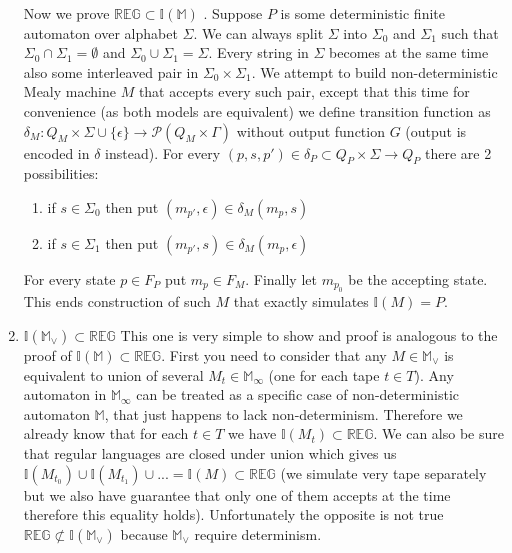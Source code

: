 \documentclass[12pt]{article}
\begin{document}
\begin{enumerate}
 Now we prove $\mathbb{REG} \subset \mathbb{I}(\mathbb{M})$ . Suppose $P$ is some deterministic finite automaton over alphabet $\Sigma$. We can always split $\Sigma$ into $\Sigma_0$ and $\Sigma_1$ such that $\Sigma_0 \cap \Sigma_1 = \emptyset$ and $\Sigma_0 \cup \Sigma_1 = \Sigma$. Every string in $\Sigma$ becomes at the same time also some interleaved pair in $\Sigma_0 \times \Sigma_1$. We attempt to build non-deterministic Mealy machine $M$ that accepts every such pair, except that this time for convenience (as both models are equivalent) we define transition function as $\delta_M : Q_M \times \Sigma \cup \{\epsilon\} \rightarrow \mathcal{P}(Q_M \times \Gamma)$ without output function $G$ (output is encoded in $\delta$ instead).  For every $(p,s,p') \in \delta_P \subset Q_P \times \Sigma \rightarrow Q_P$ there are 2 possibilities: 
\begin{enumerate}
	\item if $s \in \Sigma_0$ then put $(m_{p'},\epsilon) \in \delta_M(m_p,s) $ 
	\item if $s \in \Sigma_1$ then put $(m_{p'},s) \in \delta_M(m_p,\epsilon) $ 
\end{enumerate}
For every state $p \in F_P$ put $m_p \in F_M$. Finally let $m_{p_0}$ be the accepting state. This ends construction of such $M$  that exactly simulates $\mathbb{I}(M) = P$.

\item $\mathbb{I}(\mathbb{M}_\vee) \subset \mathbb{REG}$ This one is very simple to show and proof is analogous to the proof of $\mathbb{I}(\mathbb{M}) \subset \mathbb{REG}$. First you need to consider that any $M \in \mathbb{M}_\vee$ is equivalent to union of several $M_t \in\mathbb{M}_\infty$ (one for each tape $t \in T$). Any automaton in $\mathbb{M}_\infty$ can be treated as a specific case of non-deterministic automaton $\mathbb{M}$, that just happens to lack non-determinism. Therefore we already know that for each $t\in T$ we have $\mathbb{I}(M_t) \subset \mathbb{REG}$. We can also be sure that regular languages are closed under union which gives us $\mathbb{I}(M_{t_0}) \cup \mathbb{I}(M_{t_1}) \cup ... = \mathbb{I}(M) \subset \mathbb{REG}$ (we simulate very tape separately but we also have guarantee that only one of them accepts at the time therefore this equality holds). Unfortunately the opposite is not true $\mathbb{REG} \not\subset \mathbb{I}(\mathbb{M}_\vee) $ because $\mathbb{M}_\vee$ require determinism.


\end{enumerate}
\end{document}
